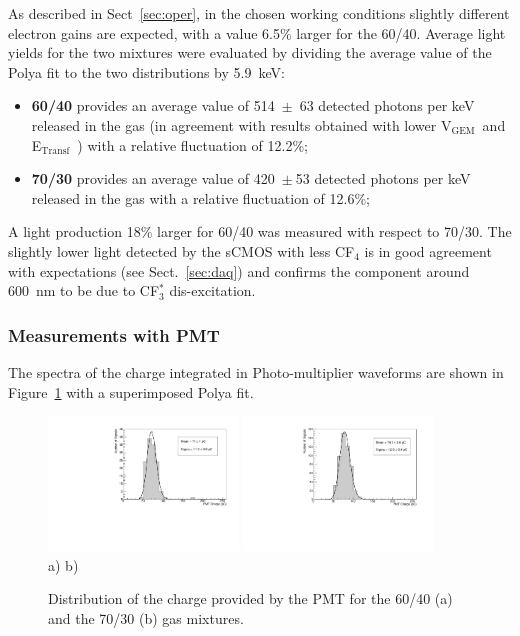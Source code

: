 \documentclass[a4paper,11pt]{article}
\newcommand{\Et}  {E$_{\mathrm{Transf}}$}
\newcommand{\Vg}  {V$_{\mathrm{GEM}}$}
\begin{document}
As described in Sect~\ref{sec:oper}, in the chosen working conditions slightly different electron gains are expected, with a value 6.5\% larger for the 60/40.
Average light yields for the two mixtures were evaluated by dividing the average value of the Polya fit to the two distributions by 5.9~keV:
\begin{itemize}
    \item {\bf 60/40} provides an average value of 514~$\pm$~63 detected photons per keV released in the gas (in agreement with results obtained with lower \Vg\ and \Et\ \cite{bib:fe55}) with a relative fluctuation of 12.2\%;
    \item {\bf 70/30} provides an average value of 420~$\pm~$53 detected photons per keV released in the gas with a relative fluctuation of 12.6\%;
\end{itemize}

A light production 18\% larger for 60/40 was measured with respect to 70/30. The slightly lower light detected by the sCMOS with less CF$_4$ is in good agreement with expectations (see Sect.~\ref{sec:daq}) and confirms the component around 600~nm to be due to CF$^*_3$ dis-excitation.

\subsubsection{Measurements with PMT}

The spectra of the charge integrated in Photo-multiplier waveforms
are shown in Figure~\ref{fig:peaksPMT} with a superimposed Polya fit.

\begin{figure}[ht]
\centering
\includegraphics[width=0.45\textwidth]{Figures/newlightCharge_Run1834_Mix60-40.pdf}
\includegraphics[width=0.45\textwidth]{Figures/newlightCharge_Run2277_Mix70-30.pdf}\\
\vspace{-0.3cm}
\mbox{a)} \hspace{5.5cm} \mbox{b)}
\vspace{-0.3cm}

\caption{Distribution of the charge provided by the PMT for the 60/40 (a) and the 70/30 (b) gas mixtures.} 
\label{fig:peaksPMT}
\end{figure}
\end{document}
